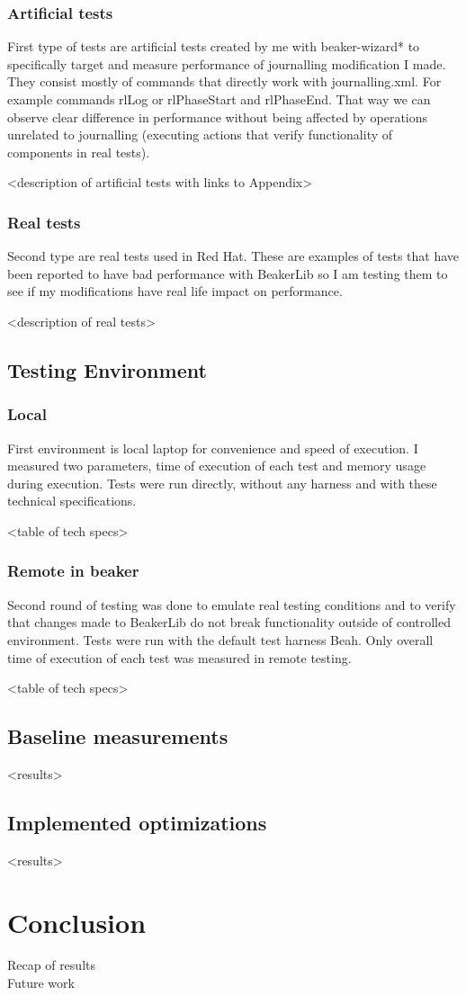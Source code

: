 \subsection{Artificial tests}
First type of tests are artificial tests created by me with beaker-wizard* to specifically target and measure performance of journalling modification I made. They consist mostly of commands that directly work with journalling.xml. For example commands rlLog or rlPhaseStart and rlPhaseEnd. That way we can observe clear difference in performance without being affected by operations unrelated to journalling (executing actions that verify functionality of components in real tests). 

<description of artificial tests with links to Appendix>

\subsection{Real tests}
Second type are real tests used in Red Hat. These are examples of tests that have been reported to have bad performance with BeakerLib so I am testing them to see if my modifications have real life impact on performance.

<description of real tests>

\section{Testing Environment}

\subsection{Local}
First environment is local laptop for convenience and speed of execution. I measured  two parameters, time of execution of each test and memory usage during execution. Tests were run directly, without any harness and with these technical specifications. 

<table of tech specs>

\subsection{Remote in beaker}
Second round of testing was done to emulate real testing conditions and to verify that changes made to BeakerLib do not break functionality outside of controlled environment. Tests were run with the default test harness Beah. Only overall time of execution of each test was measured in remote testing.

<table of tech specs>

\section{Baseline measurements}
<results>


\section{Implemented optimizations}
<results>

\chapter{Conclusion}
Recap of results
\\
Future work


